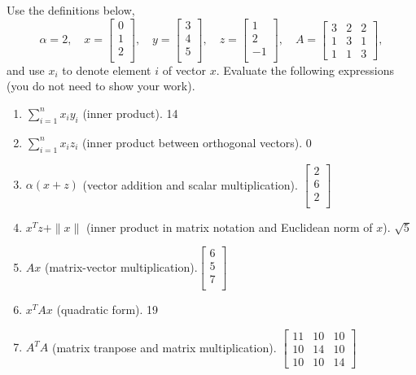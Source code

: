 \documentclass{article}
\def\blu#1{{\color{blu}#1}}
\def\red#1{{\color{red}#1}}
\def\norm#1{\|#1\|}
\def\enum#1{\begin{enumerate}#1\end{enumerate}}
\begin{document}
Use the definitions below,
\[
\alpha = 2,\quad
x = \left[\begin{array}{c}
0\\
1\\
2\\
\end{array}\right], \quad
y = \left[\begin{array}{c}
3\\
4\\
5\\
\end{array}\right],\quad
z = \left[\begin{array}{c}
1\\
2\\
-1\\
\end{array}\right],\quad
A = \left[\begin{array}{ccc}
3 & 2 & 2\\
1 & 3 & 1\\
1 & 1 & 3
\end{array}\right],
\]
and use $x_i$ to denote element $i$ of vector $x$.
\blu{Evaluate the following expressions} (you do not need to show your work).
\enum{
\item $\sum_{i=1}^n x_iy_i$ (inner product). \red{14}
\item $\sum_{i=1}^n x_iz_i$ (inner product between orthogonal vectors). \red{0}
\item $\alpha(x+z)$ (vector addition and scalar multiplication). 
\red{ $\left[\begin{array}{c}
2\\
6\\
2\\
\end{array}\right]$}
\item $x^Tz + \norm{x}$ (inner product in matrix notation and Euclidean norm of $x$). \red{$\sqrt{5}$}
\item $Ax$ (matrix-vector multiplication).\red{$\left[\begin{array}{c}
6\\
5\\
7\\
\end{array}\right]$}
\item $x^TAx$ (quadratic form). \red{19}
\item $A^TA$ (matrix tranpose and matrix multiplication). \red{$\left[\begin{array}{ccc}
11 & 10 & 10\\
10 & 14 & 10\\
10 & 10 & 14
\end{array}\right]$}
}
\end{document}
